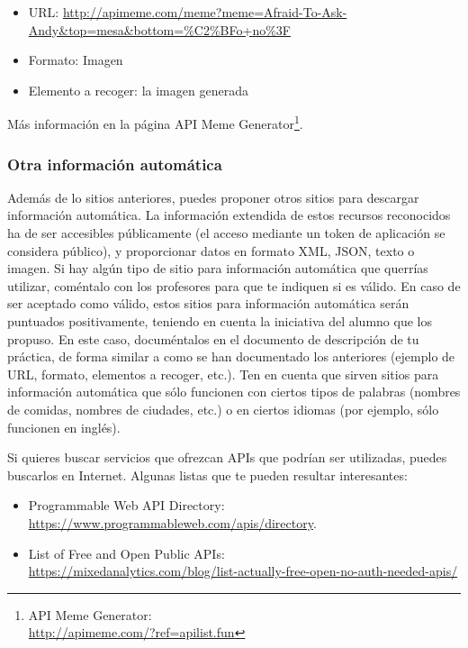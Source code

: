 \begin{itemize}
\item URL: \url{http://apimeme.com/meme?meme=Afraid-To-Ask-Andy&top=mesa&bottom=%C2%BFo+no%3F}
\item Formato: Imagen
\item Elemento a recoger: la imagen generada
\end{itemize}

Más información en la página API Meme Generator\footnote{API Meme Generator: \\ \url{http://apimeme.com/?ref=apilist.fun}}.


\subsubsection{Otra información automática}


Además de lo sitios anteriores, puedes proponer otros sitios para descargar información automática. La información extendida de estos recursos reconocidos ha de ser accesibles públicamente (el acceso mediante un token de aplicación se considera público), y proporcionar datos en formato XML, JSON, texto o imagen. Si hay algún tipo de sitio para información automática que querrías utilizar, coméntalo con los profesores para que te indiquen si es válido. En caso de ser aceptado como válido, estos sitios para información automática serán puntuados positivamente, teniendo en cuenta la iniciativa del alumno que los propuso. En este caso, documéntalos en el documento de descripción de tu práctica, de forma similar a como se han documentado los anteriores (ejemplo de URL, formato, elementos a recoger, etc.). Ten en cuenta que sirven sitios para información automática que sólo funcionen con ciertos tipos de palabras (nombres de comidas, nombres de ciudades, etc.) o en ciertos idiomas (por ejemplo, sólo funcionen en inglés).

Si quieres buscar servicios que ofrezcan APIs que podrían ser utilizadas, puedes buscarlos en Internet. Algunas listas que te pueden resultar interesantes:

\begin{itemize}
\item Programmable Web API Directory: \\
  \url{https://www.programmableweb.com/apis/directory}.
\item List of Free and Open Public APIs: \\
  \url{https://mixedanalytics.com/blog/list-actually-free-open-no-auth-needed-apis/}
\end{itemize}


